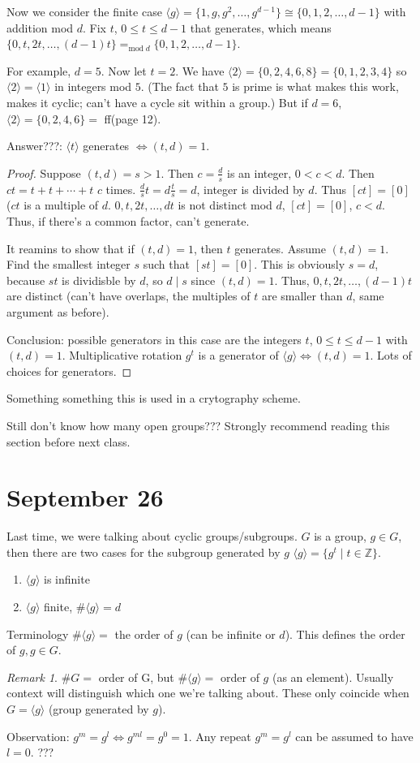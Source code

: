 \documentclass{article}
\theoremstyle{plain}
\theoremstyle{remark}
\newtheorem{remark}{Remark}
\newcommand{\Z}{{\mathbb Z}}
\begin{document}
Now we consider the finite case $\langle g \rangle = \{1,g,g^2,\dots,g^{d-1}\}
\cong \{0,1,2,\dots,d-1\}$ with addition mod $d$.
Fix $t$, $0\leq t \leq d-1$ that generates,
which means $\{0,t,2t,\dots,(d-1)t\} =_{\mathrm{mod}\;d}
\{0,1,2,\dots,d-1\}$.

For example, $d = 5$.
Now let $t = 2$.
We have $\langle 2 \rangle = \{0,2,4,6,8\} = \{0,1,2,3,4\}$
so $\langle 2 \rangle = \langle 1 \rangle$ in integers mod $5$.
(The fact that $5$ is prime is what makes this work,
makes it cyclic;
can't have a cycle sit within a group.)
But if $d=6$, $\langle 2 \rangle = \{0,2,4,6\} =$ ff(page 12).

Answer???: $\langle t \rangle$ generates $\iff (t,d) = 1$.
\begin{proof}
	Suppose $(t,d) = s > 1$.
	Then $c = \frac{d}{s}$ is an integer, $0<c<d$.
	Then $ct = t + t + \cdots + t$ $c$ times.
	$\frac{d}{s}t = d\frac{t}{s} = d$, integer is divided by $d$.
	Thus $[ct] = [0]$ ($ct$ is a multiple of $d$.
	$0,t,2t,\dots,dt$ is not distinct mod $d$, $[ct] = [0]$, $c < d$.
	Thus, if there's a common factor, can't generate.

	It reamins to show that if $(t,d) = 1$, then $t$ generates.
	Assume $(t,d) = 1$.
	Find the smallest integer $s$ such that $[st]=[0]$.
	This is obviously $s=d$, because $st$ is dividisble by $d$,
	so $d \mid s$ since $(t,d) = 1$.
	Thus, $0, t, 2t, \dots, (d-1)t$ are distinct
	(can't have overlaps, the multiples of $t$ are smaller than $d$,
	same argument as before).

	Conclusion: possible generators in this case are
	the integers $t$, $0 \leq t \leq d-1$ with $(t,d) = 1$.
	Multiplicative rotation $g^t$ is a generator of
	$\langle g \rangle \iff (t,d) = 1$.
	Lots of choices for generators.
\end{proof}
Something something this is used in a crytography scheme.

Still don't know how many open groups???
Strongly recommend reading this section before next class.

\section{September 26}
Last time, we were talking about cyclic groups/subgroups.
$G$ is a group, $g \in G$,
then there are two cases for the subgroup generated by $g$
$\langle g \rangle = \{g^t \mid t \in \Z\}$.
\begin{enumerate}
	\item $\langle g \rangle$ is infinite
	\item $\langle g \rangle$ finite, $\#\langle g \rangle = d$
\end{enumerate}
Terminology $\# \langle g \rangle =$ the order of $g$ (can be infinite or $d$).
This defines the order of $g, g \in G$.
\begin{remark}
	$\#G = $ order of G, but $\#\langle g \rangle = $ order of $g$ (as an element).
	Usually context will distinguish which one we're talking about.
	These only coincide when $G = \langle g \rangle$ (group generated by $g$).
\end{remark}
Observation: $g^m = g^l \iff g^{ml} = g^0 = 1$.
Any repeat $g^m = g^l$ can be assumed to have $l = 0$. ???
\end{document}

